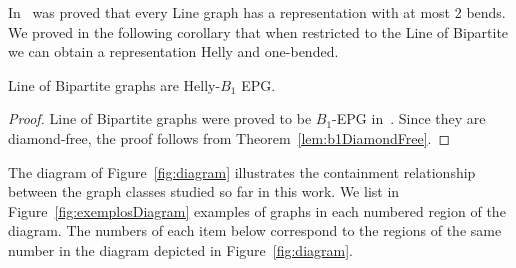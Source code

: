 \documentclass{dmgt}
\begin{document}
In~\cite{daniel2014b} was proved that every Line graph has a representation with at most 2 bends. We proved in the following corollary that when restricted to the Line of Bipartite we can obtain a representation Helly and one-bended.

\begin{cor}\label{coro:lineOfBipartite}
 Line of Bipartite graphs are Helly-$B_1$ EPG. 
\end{cor}

\begin{proof}
Line of Bipartite graphs were proved to be $B_1$-EPG in~\cite{golumbic2018edge}. Since they are diamond-free, the proof follows from Theorem~\ref{lem:b1DiamondFree}.
 
\end{proof}

The diagram of Figure~\ref{fig:diagram}
illustrates the containment relationship between the graph classes  studied so far in this work. 
We list in Figure~\ref{fig:exemplosDiagram} examples of graphs in each numbered region of the diagram. The numbers of each item below correspond to the regions of the same number in the diagram depicted in Figure~\ref{fig:diagram}.

\end{document}
